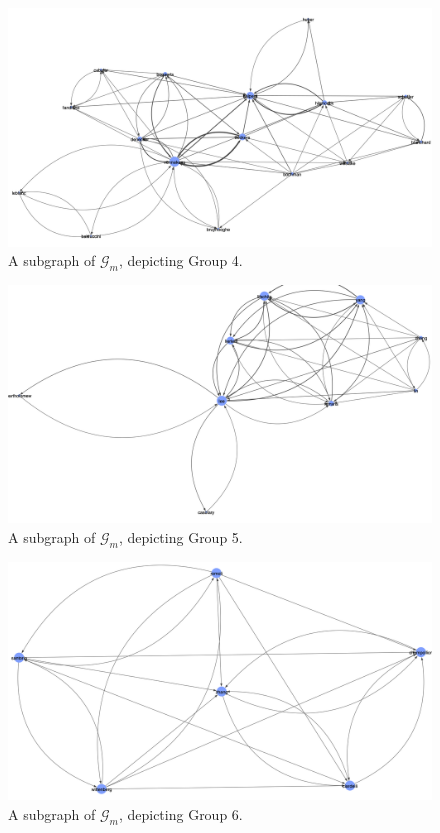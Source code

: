 \documentclass[11pt,a4paper]{book}
\theoremstyle{definition}
\theoremstyle{definition}
\theoremstyle{definition}
\theoremstyle{remark}
\newcommand{\acgraph}{\mathcal{G}_{m}}
\begin{document}
\begin{figure}
\includegraphics[width=\textwidth]{mgraph_group_4.png}
\caption{A subgraph of $\acgraph$, depicting Group 4.}
\label{fig:mgraph-community-4}
\end{figure}

\begin{figure}
\includegraphics[width=\textwidth]{mgraph_group_5.png}
\caption{A subgraph of $\acgraph$, depicting Group 5.}
\label{fig:mgraph-community-5}
\end{figure}

\begin{figure}
\includegraphics[width=\textwidth]{mgraph_group_6.png}
\caption{A subgraph of $\acgraph$, depicting Group 6.}
\label{fig:mgraph-community-6}
\end{figure}
\end{document}
